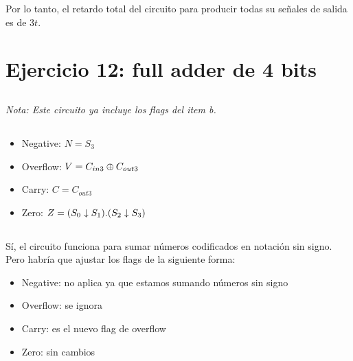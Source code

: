 Por lo tanto, el retardo total del circuito para producir todas su señales de salida es de $3t$.

\pagebreak

\section{Ejercicio 12: full adder de 4 bits}

\subsection{}

\begin{figure}[ht]
    
\end{figure}

\emph{Nota: Este circuito ya incluye los flags del item b.}

\subsection{}

\begin{itemize}
    \item Negative: $N = S_3$
    \item Overflow: $V = C_{in3} \oplus C_{out3}$
    \item Carry: $C = C_{out3}$
    \item Zero: $Z = (S_0 \downarrow S_1) . (S_2 \downarrow S_3)$
\end{itemize}

\subsection{}

Sí, el circuito funciona para sumar números codificados en notación sin signo. Pero habría que ajustar los flags de la siguiente forma:

\begin{itemize}
    \item Negative: no aplica ya que estamos sumando números sin signo
    \item Overflow: se ignora
    \item Carry: es el nuevo flag de overflow
    \item Zero: sin cambios
\end{itemize}

\subsection{}

